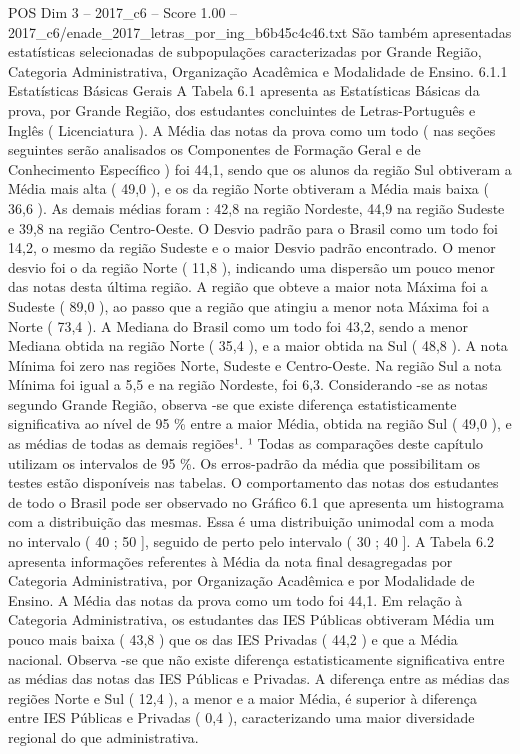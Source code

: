 \begin{textsample}{POS Dim 3 – 2017\_c6 – Score 1.00 – 2017\_c6/enade\_2017\_letras\_por\_ing\_b6b45c4c46.txt}
São também apresentadas estatísticas selecionadas de subpopulações caracterizadas por Grande Região, Categoria Administrativa, Organização Acadêmica e Modalidade de Ensino. 6.1.1 Estatísticas Básicas Gerais A Tabela 6.1 apresenta as Estatísticas Básicas da prova, por Grande Região, dos estudantes concluintes de Letras-Português e Inglês ( Licenciatura ).
A Média das notas da prova como um todo ( nas seções seguintes serão analisados os Componentes de Formação Geral e de Conhecimento Específico ) foi 44,1, sendo que os alunos da região Sul obtiveram a Média mais alta ( 49,0 ), e os da região Norte obtiveram a Média mais baixa ( 36,6 ).
As demais médias foram : 42,8 na região Nordeste, 44,9 na região Sudeste e 39,8 na região Centro-Oeste.
O Desvio padrão para o Brasil como um todo foi 14,2, o mesmo da região Sudeste e o maior Desvio padrão encontrado.
O menor desvio foi o da região Norte ( 11,8 ), indicando uma dispersão um pouco menor das notas desta última região.
A região que obteve a maior nota Máxima foi a Sudeste ( 89,0 ), ao passo que a região que atingiu a menor nota Máxima foi a Norte ( 73,4 ).
A Mediana do Brasil como um todo foi 43,2, sendo a menor Mediana obtida na região Norte ( 35,4 ), e a maior obtida na Sul ( 48,8 ).
A nota Mínima foi zero nas regiões Norte, Sudeste e Centro-Oeste.
Na região Sul a nota Mínima foi igual a 5,5 e na região Nordeste, foi 6,3.
Considerando -se as notas segundo Grande Região, observa -se que existe diferença estatisticamente significativa ao nível de 95 \% entre a maior Média, obtida na região Sul ( 49,0 ), e as médias de todas as demais regiões¹. ¹ Todas as comparações deste capítulo utilizam os intervalos de 95 \%.
Os erros-padrão da média que possibilitam os testes estão disponíveis nas tabelas.
O comportamento das notas dos estudantes de todo o Brasil pode ser observado no Gráfico 6.1 que apresenta um histograma com a distribuição das mesmas.
Essa é uma distribuição unimodal com a moda no intervalo ( 40 ; 50 ], seguido de perto pelo intervalo ( 30 ; 40 ].
A Tabela 6.2 apresenta informações referentes à Média da nota final desagregadas por Categoria Administrativa, por Organização Acadêmica e por Modalidade de Ensino.
A Média das notas da prova como um todo foi 44,1.
Em relação à Categoria Administrativa, os estudantes das IES Públicas obtiveram Média um pouco mais baixa ( 43,8 ) que os das IES Privadas ( 44,2 ) e que a Média nacional.
Observa -se que não existe diferença estatisticamente significativa entre as médias das notas das IES Públicas e Privadas.
A diferença entre as médias das regiões Norte e Sul ( 12,4 ), a menor e a maior Média, é superior à diferença entre IES Públicas e Privadas ( 0,4 ), caracterizando uma maior diversidade regional do que administrativa.

\end{textsample}
